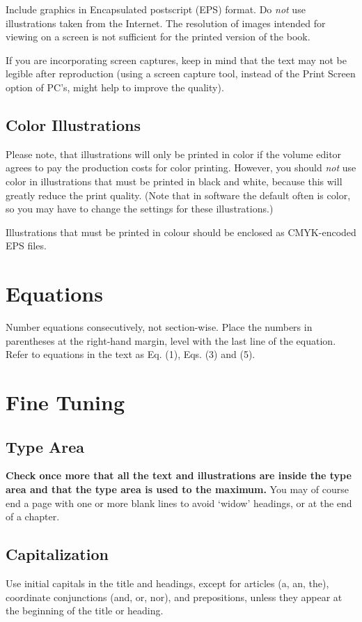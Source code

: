 \documentclass{Bigpool}
\begin{document}
Include graphics in Encapsulated postscript (EPS) format. Do \textit{not} use illustrations
taken from the Internet. The resolution of images intended for viewing on a screen is
not sufficient for the printed version of the book.

If you are incorporating screen captures, keep in mind that the text may not be
legible after reproduction (using a screen capture tool, instead of the Print Screen
option of PC's, might help to improve the quality).

\subsection{Color Illustrations}
Please note, that illustrations will only be printed in color if the volume editor agrees to
pay the production costs for color printing. However, you should \textit{not} use color in
illustrations that must be printed in black and white, because this will greatly reduce the
print quality. (Note that in software the default often is color, so you may have to
change the settings for these illustrations.)

Illustrations that must be printed in colour should be enclosed as CMYK-encoded
EPS files.


\section{Equations}
Number equations consecutively, not section-wise. Place the numbers in parentheses at
the right-hand margin, level with the last line of the equation. Refer to equations in the
text as Eq. (1), Eqs. (3) and (5).

\section{Fine Tuning}

\subsection{Type Area}
\textbf{Check once more that all the text and illustrations are inside the type area and
that the type area is used to the maximum.} You may of course end a page with one
or more blank lines to avoid `widow' headings, or at the end of a chapter.

\subsection{Capitalization}
Use initial capitals in the title and headings, except for articles (a, an, the), coordinate
conjunctions (and, or, nor), and prepositions, unless they appear at the beginning of the
title or heading.
\end{document}
